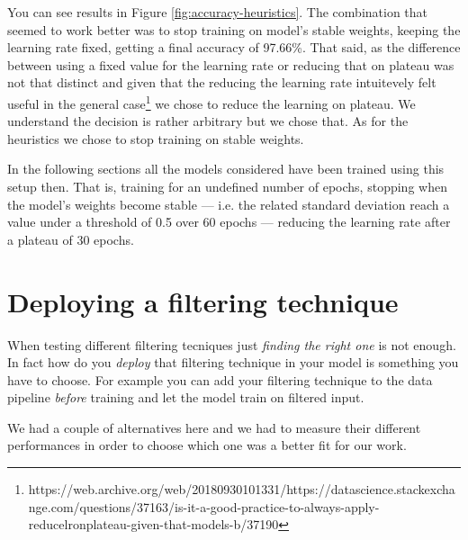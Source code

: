 You can see results in Figure \ref{fig:accuracy-heuristics}. The
combination that seemed to work better was to stop training on model's
stable weights, keeping the learning rate fixed, getting a final
accuracy of 97.66\%. That said, as the difference between using a fixed
value for the learning rate or reducing that on plateau was not that
distinct and given that the reducing the learning rate intuitevely felt
useful in the general
case\footnote{https://web.archive.org/web/20180930101331/https://datascience.stackexchange.com/questions/37163/is-it-a-good-practice-to-always-apply-reducelronplateau-given-that-models-b/37190}
we chose to reduce the learning on plateau. We understand the decision
is rather arbitrary but we chose that. As for the heuristics we chose
to stop training on stable weights.

In the following sections all the models considered have been trained
using this setup then. That is, training for an undefined number of
epochs, stopping when the model's weights become stable --- i.e. the
related standard deviation reach a value under a threshold of 0.5 over
60 epochs --- reducing the learning rate after a plateau of 30 epochs.


\section{Deploying a filtering technique}
\label{sec:deploying-a-filtering-technique}

When testing different filtering tecniques just \emph{finding the right
  one} is not enough. In fact how do you \emph{deploy} that filtering
technique in your model is something you have to choose. For example
you can add your filtering technique to the data pipeline \emph{before}
training and let the model train on filtered input.

We had a couple of alternatives here and we had to measure their
different performances in order to choose which one was a better fit
for our work.

